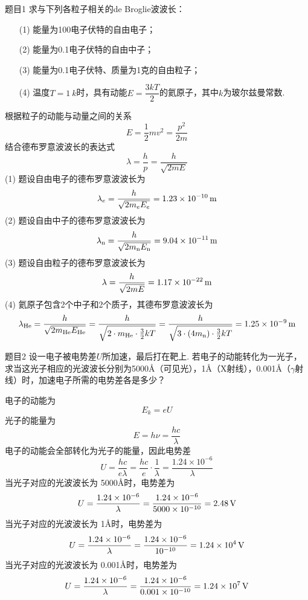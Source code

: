 \begin{question}{题目1}
    求与下列各粒子相关的de Broglie波波长：
    \begin{enumerate}
        \item[(1)] 能量为100电子伏特的自由电子；
        \item[(2)] 能量为0.1电子伏特的自由中子；
        \item[(3)] 能量为0.1电子伏特、质量为1克的自由粒子；
        \item[(4)] 温度$T=\qty{1}{k}$时，具有动能$E=\dfrac{3kT}{2}$的氦原子，其中$k$为玻尔兹曼常数.
    \end{enumerate}
\end{question}
\begin{solution}
    根据粒子的动能与动量之间的关系
    \begin{equation}\label{能量与动量关系}
        E=\frac{1}{2}mv^2=\frac{p^2}{2m}
    \end{equation}
    结合德布罗意波波长的表达式
    \begin{equation}\label{德布罗意关系}
        \lambda=\frac{h}{p}=\frac{h}{\sqrt{2mE}}
    \end{equation}
    (1) 题设自由电子的德布罗意波波长为
    $$
        \lambda_{e}=\frac{h}{\sqrt{2m_eE_e}}=1.23\times10^{-10}\,{\rm m}
    $$
    (2) 题设自由中子的德布罗意波波长为
    $$
        \lambda_{\rm n}=\frac{h}{\sqrt{2m_{\rm n}E_{\rm n}}}=9.04\times10^{-11}\,{\rm m}
    $$
    (3) 题设自由粒子的德布罗意波波长为
    $$
        \lambda=\frac{h}{\sqrt{2mE}}=1.17\times10^{-22} \,{\rm m}
    $$
    (4) 氦原子包含2个中子和2个质子，其德布罗意波波长为
    $$
        \lambda_{\rm He}=\frac{h}{\sqrt{2m_{\rm He}E_{\rm He}}}
        =\frac{h}{\sqrt{2 \cdot m_{\rm He}\cdot\frac{3}{2}kT}}
        =\frac{h}{\sqrt{3\cdot(4m_{\rm n})\cdot\frac{3}{2}kT}}
        =1.25\times10^{-9} \,{\rm m}
    $$
\end{solution}

\begin{question}{题目2}
    设一电子被电势差$U$所加速，最后打在靶上. 若电子的动能转化为一光子，求当这光子相应的光波波长分别为5000\AA（可见光），1\AA（X射线），0.001\AA（$\gamma$射线）时，加速电子所需的电势差各是多少？
\end{question}
\begin{solution}
    电子的动能为
    $$
        E_k=eU
    $$
    光子的能量为
    $$
        E=h\nu=\frac{hc}{\lambda}
    $$
    电子的动能会全部转化为光子的能量，因此电势差
    $$
        U=\frac{hc}{e\lambda}
        =\frac{hc}{e}\cdot\frac{1}{\lambda}
        =\frac{1.24\times10^{-6}}{\lambda}
    $$
    当光子对应的光波波长为 5000\AA 时，电势差为
    $$
        U=\frac{1.24\times10^{-6}}{\lambda}
        =\frac{1.24\times10^{-6}}{5000\times10^{-10}}
        =2.48\,\rm{V}
    $$
    当光子对应的光波波长为 1\AA 时，电势差为
    $$
        U=\frac{1.24\times10^{-6}}{\lambda}
        =\frac{1.24\times10^{-6}}{10^{-10}}
        =1.24\times10^4\,\rm{V}
    $$
    当光子对应的光波波长为 0.001\AA 时，电势差为
    $$
        U=\frac{1.24\times10^{-6}}{\lambda}
        =\frac{1.24\times10^{-6}}{0.001\times10^{-10}}
        =1.24\times10^{7}\,\rm{V}
    $$
\end{solution}


